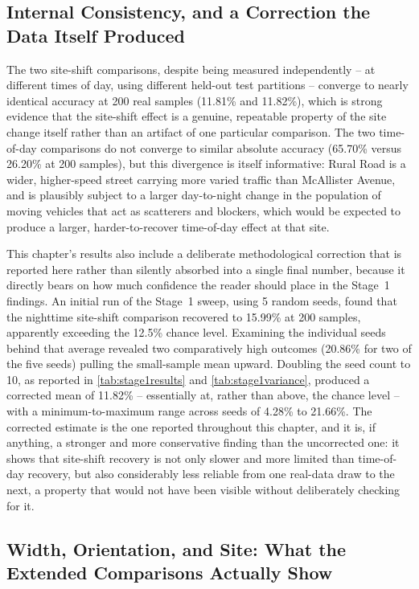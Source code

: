 \documentclass{iutbscthesis}
\begin{document}
\subsection{Internal Consistency, and a Correction the Data Itself Produced}

The two site-shift comparisons, despite being measured independently -- at different times of day, using different held-out test partitions -- converge to nearly identical accuracy at 200 real samples (11.81\% and 11.82\%), which is strong evidence that the site-shift effect is a genuine, repeatable property of the site change itself rather than an artifact of one particular comparison. The two time-of-day comparisons do not converge to similar absolute accuracy (65.70\% versus 26.20\% at 200 samples), but this divergence is itself informative: Rural Road is a wider, higher-speed street carrying more varied traffic than McAllister Avenue, and is plausibly subject to a larger day-to-night change in the population of moving vehicles that act as scatterers and blockers, which would be expected to produce a larger, harder-to-recover time-of-day effect at that site.

This chapter's results also include a deliberate methodological correction that is reported here rather than silently absorbed into a single final number, because it directly bears on how much confidence the reader should place in the Stage~1 findings. An initial run of the Stage~1 sweep, using 5 random seeds, found that the nighttime site-shift comparison recovered to 15.99\% at 200 samples, apparently exceeding the 12.5\% chance level. Examining the individual seeds behind that average revealed two comparatively high outcomes (20.86\% for two of the five seeds) pulling the small-sample mean upward. Doubling the seed count to 10, as reported in \autoref{tab:stage1results} and \autoref{tab:stage1variance}, produced a corrected mean of 11.82\% -- essentially at, rather than above, the chance level -- with a minimum-to-maximum range across seeds of 4.28\% to 21.66\%. The corrected estimate is the one reported throughout this chapter, and it is, if anything, a stronger and more conservative finding than the uncorrected one: it shows that site-shift recovery is not only slower and more limited than time-of-day recovery, but also considerably less reliable from one real-data draw to the next, a property that would not have been visible without deliberately checking for it.

\subsection{Width, Orientation, and Site: What the Extended Comparisons Actually Show}
\label{sec:interpretingresultsstage3}
\end{document}

